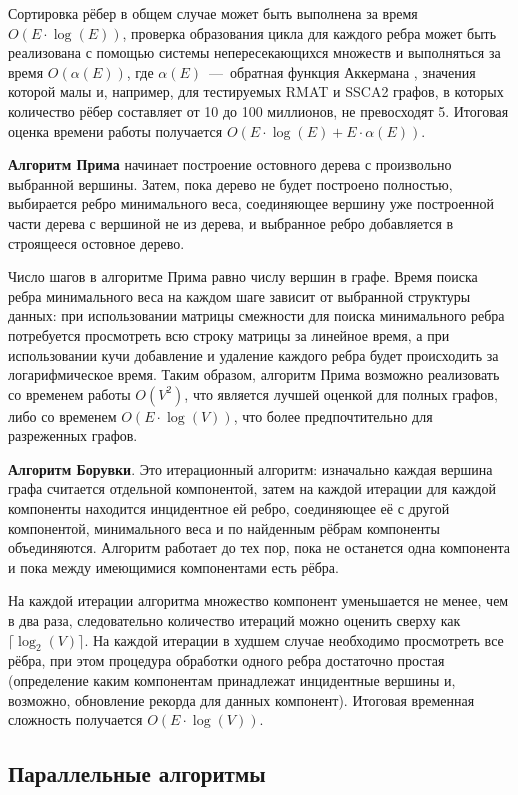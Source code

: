 \documentclass[a4paper,12pt]{extarticle}
\begin{document}
Сортировка рёбер в общем случае может быть выполнена за время $O(E \cdot \log(E))$, проверка образования цикла для каждого ребра может быть реализована с помощью системы непересекающихся множеств и выполняться за время $O(\alpha(E))$, где $\alpha(E)$~---~обратная функция Аккермана \cite{ackermann}, значения которой малы и, например, для тестируемых RMAT и SSCA2 графов, в которых количество рёбер составляет от 10 до 100 миллионов, не превосходят 5. Итоговая оценка времени работы получается $O(E \cdot \log(E) + E \cdot \alpha(E))$.

\textbf{Алгоритм Прима} начинает построение остовного дерева с произвольно выбранной вершины. Затем, пока дерево не будет построено полностью, выбирается ребро минимального веса, соединяющее вершину уже построенной части дерева с вершиной не из дерева, и выбранное ребро добавляется в строящееся остовное дерево.

Число шагов в алгоритме Прима равно числу вершин в графе. Время поиска ребра минимального веса на каждом шаге зависит от выбранной структуры данных: при использовании матрицы смежности для поиска минимального ребра потребуется просмотреть всю строку матрицы за линейное время, а при использовании кучи добавление и удаление каждого ребра будет происходить за логарифмическое время. 
Таким образом, алгоритм Прима возможно реализовать со временем работы $O(V^2)$, что является лучшей оценкой для полных графов, либо со временем $O(E \cdot \log(V))$, что более предпочтительно для разреженных графов.

\textbf{Алгоритм Борувки}.
Это итерационный алгоритм: изначально каждая вершина графа считается отдельной компонентой, затем на каждой итерации для каждой компоненты находится инцидентное ей ребро, соединяющее её с другой компонентой, минимального веса и по найденным рёбрам компоненты объединяются. Алгоритм работает до тех пор, пока не останется одна компонента и пока между имеющимися компонентами есть рёбра.

На каждой итерации алгоритма множество компонент уменьшается не менее, чем в два раза, следовательно количество итераций можно оценить сверху как $\lceil \log_2(V) \rceil$. На каждой итерации в худшем случае необходимо просмотреть все рёбра, при этом процедура обработки одного ребра достаточно простая (определение каким компонентам принадлежат инцидентные вершины и, возможно, обновление рекорда для данных компонент). Итоговая временная сложность получается $O(E \cdot \log(V))$.

\subsection{Параллельные алгоритмы}
\label{subsec:reviewParallel}
\end{document}
